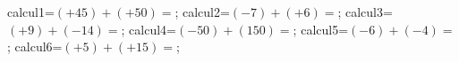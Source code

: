 \documentclass[exercice]{thedocument}%
\begin{document}
%
\>calcul1=$(+45)+(+50)=$;%
\>calcul2=$(-7)+(+6)=$;%
\>calcul3=$(+9)+(-14)=$;%
\>calcul4=$(-50)+(150)=$;%
\>calcul5=$(-6)+(-4)=$;%
\>calcul6=$(+5)+(+15)=$;%
%
\end{document}
